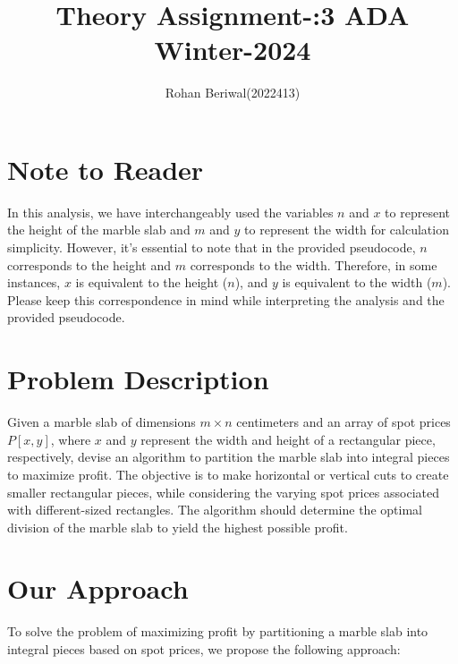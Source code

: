\documentclass{article}
\title{Theory Assignment-:3 ADA Winter-2024}
\author{Rohan Beriwal(2022413)}
\begin{document}
\maketitle

\section*{Note to Reader}
In this analysis, we have interchangeably used the variables $n$ and $x$ to represent the height of the marble slab and $m$ and $y$ to represent the width for calculation simplicity. However, it's essential to note that in the provided pseudocode, $n$ corresponds to the height and $m$ corresponds to the width. Therefore, in some instances, $x$ is equivalent to the height ($n$), and $y$ is equivalent to the width ($m$). Please keep this correspondence in mind while interpreting the analysis and the provided pseudocode.

\section*{Problem Description}
Given a marble slab of dimensions $m \times n$ centimeters and an array of spot prices $P[x, y]$, where $x$ and $y$ represent the width and height of a rectangular piece, respectively, devise an algorithm to partition the marble slab into integral pieces to maximize profit. The objective is to make horizontal or vertical cuts to create smaller rectangular pieces, while considering the varying spot prices associated with different-sized rectangles. The algorithm should determine the optimal division of the marble slab to yield the highest possible profit.


\section{Our Approach}

To solve the problem of maximizing profit by partitioning a marble slab into integral pieces based on spot prices, we propose the following approach:
\end{document}
